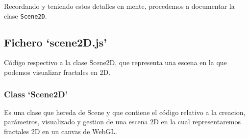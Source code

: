 Recordando y teniendo estos detalles en mente, procedemos a documentar la clase \verb|Scene2D|.

\subsection{Fichero `scene2D.js'}

Código respectivo a la clase Scene2D, que representa una escena en la que podemos visualizar fractales en 2D.

\subsubsection{Class `Scene2D'}

Es una clase que hereda de Scene y que contiene el código relativo a la creacion, parámetros, visualizado y gestion de una escena 2D en la cual representaremos fractales 2D en un canvas de WebGL.

